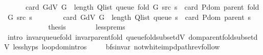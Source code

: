 \begin{isabellebody}
\isanewline
\ \ \ \ \ \ {\isachardoublequoteopen}card\ {\isacharparenleft}{\kern0pt}G{\isachardot}{\kern0pt}dV\ G{\isacharparenright}{\kern0pt}\ {\isacharplus}{\kern0pt}\ length\ {\isacharparenleft}{\kern0pt}Q{\isacharunderscore}{\kern0pt}list\ {\isacharparenleft}{\kern0pt}queue\ {\isacharparenleft}{\kern0pt}fold\ G\ src\ s{\isacharparenright}{\kern0pt}{\isacharparenright}{\kern0pt}{\isacharparenright}{\kern0pt}\ {\isacharminus}{\kern0pt}\ card\ {\isacharparenleft}{\kern0pt}P{\isachardot}{\kern0pt}dom\ {\isacharparenleft}{\kern0pt}parent\ {\isacharparenleft}{\kern0pt}fold\ G\ src\ s{\isacharparenright}{\kern0pt}{\isacharparenright}{\kern0pt}{\isacharparenright}{\kern0pt}\ {\isacharless}{\kern0pt}\isanewline
\ \ \ \ \ \ \ card\ {\isacharparenleft}{\kern0pt}G{\isachardot}{\kern0pt}dV\ G{\isacharparenright}{\kern0pt}\ {\isacharplus}{\kern0pt}\ length\ {\isacharparenleft}{\kern0pt}Q{\isacharunderscore}{\kern0pt}list\ {\isacharparenleft}{\kern0pt}queue\ s{\isacharparenright}{\kern0pt}{\isacharparenright}{\kern0pt}\ {\isacharminus}{\kern0pt}\ card\ {\isacharparenleft}{\kern0pt}P{\isachardot}{\kern0pt}dom\ {\isacharparenleft}{\kern0pt}parent\ s{\isacharparenright}{\kern0pt}{\isacharparenright}{\kern0pt}{\isachardoublequoteclose}\isanewline
\ \ \ \ \ \ \isacommand{{\isachardot}{\kern0pt}}\isamarkupfalse%
\isanewline
\ \ \ \ \isamarkupfalse%
\ {\isacharquery}{\kern0pt}thesis\isanewline
\ \ \ \ \ \ \isamarkupfalse%
\ less{\isachardot}{\kern0pt}prems\isanewline
\ \ \ \ \ \ \isamarkupfalse%
\ {\isacharparenleft}{\kern0pt}intro\ invar{\isacharunderscore}{\kern0pt}queue{\isacharunderscore}{\kern0pt}fold{\isacharunderscore}{\kern0pt}{}\ invar{\isacharunderscore}{\kern0pt}parent{\isacharunderscore}{\kern0pt}fold{\isacharunderscore}{\kern0pt}{}\ queue{\isacharunderscore}{\kern0pt}fold{\isacharunderscore}{\kern0pt}subset{\isacharunderscore}{\kern0pt}dV\ dom{\isacharunderscore}{\kern0pt}parent{\isacharunderscore}{\kern0pt}fold{\isacharunderscore}{\kern0pt}subset{\isacharunderscore}{\kern0pt}dV{\isacharunderscore}{\kern0pt}{}\ less{\isachardot}{\kern0pt}hyps\ loop{\isachardot}{\kern0pt}domintros{\isacharparenright}{\kern0pt}\isanewline
\ \ \isamarkupfalse%
\isanewline
{}\isamarkupfalse%
%
\endisatagvisible
{\isafoldvisible}%
%
\isadelimvisible
\isanewline
%
\endisadelimvisible
\isanewline
{}\isamarkupfalse%
\ {\isacharparenleft}{\kern0pt}\ bfs{\isacharunderscore}{\kern0pt}invar{\isacharparenright}{\kern0pt}\ not{\isacharunderscore}{\kern0pt}white{\isacharunderscore}{\kern0pt}imp{\isacharunderscore}{\kern0pt}dpath{\isacharunderscore}{\kern0pt}rev{\isacharunderscore}{\kern0pt}follow{\isacharcolon}{\kern0pt}\isanewline

\end{isabellebody}
